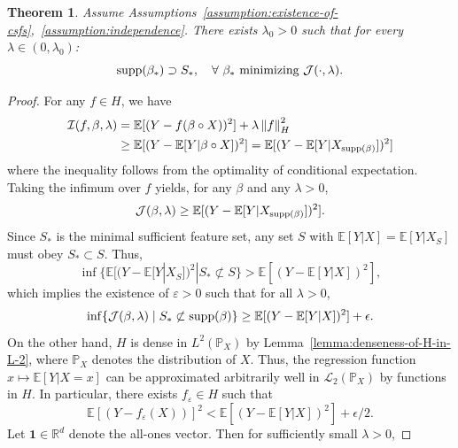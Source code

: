 \documentclass[sn-mathphys-num]{sn-jnl}%
\numberwithin{equation}{section}
\newcommand{\R}{\mathbb{R}}
\newcommand{\E}{\mathbb{E}}
\newcommand{\norm}[1]{\left\|{#1}\right\|} %
\renewcommand{\P}{\mathbb{P}}
\newcommand{\eps}{\epsilon}
\newcommand{\supp}{\mathop{\rm supp}}
\theoremstyle{thmstyleone}%
\newtheorem{theorem}{Theorem}%
\theoremstyle{thmstyletwo}%
\theoremstyle{thmstylethree}%
\begin{document}
\vspace{.5em} 
\begin{theorem}
\label{theorem:global-minimizer-two}
Assume Assumptions~\ref{assumption:existence-of-csfs},~\ref{assumption:independence}. 
There exists $\lambda_0 > 0$ such that for every $\lambda \in (0, \lambda_0)$: 
\begin{equation*}
	\supp(\beta_*) \supset S_*,~~~\forall~\beta_*~\text{minimizing}~\mathcal{J}(\cdot, \lambda). 
\end{equation*}
\end{theorem} 
\begin{proof} 
For any $f \in H$, we have 
\begin{equation*}
\begin{split} 
	\mathcal{I}(f, \beta, \lambda) &= \E[(Y - f(\beta \circ X))^2] + \lambda \norm{f}_H^2  \\
		&\ge \E[(Y - \E[Y| \beta \circ X])^2] = \E[(Y - \E[Y|X_{\supp(\beta)}])^2]
\end{split} 
\end{equation*} 
where the inequality follows from the optimality of conditional expectation.
Taking the infimum over $f$ yields, for any $\beta$ and any $\lambda > 0$,
\begin{equation*}
	\mathcal{J}(\beta, \lambda) \ge \E[(Y - \E[Y|X_{\supp(\beta)}])^2].
\end{equation*}
Since $S_*$ is the minimal sufficient feature set, any set $S$ with $\E[Y|X] = \E[Y|X_S]$ must obey 
$S_* \subset S$. Thus, 
\begin{equation*}
	\inf\{\E[(Y - \E[Y|X_S])^2 | S_* \not \subset S\} > \E[(Y - \E[Y|X])^2],
\end{equation*} 
which implies the existence of $\varepsilon > 0$ such that for all $\lambda > 0$,
\begin{equation*}
	\inf\{\mathcal{J}(\beta, \lambda) \mid S_* \not \subset \supp(\beta)\} \ge \E[(Y - \E[Y|X])^2] + \eps.
\end{equation*}
On the other hand, $H$ is dense in $L^2(\P_X)$ by Lemma~\ref{lemma:denseness-of-H-in-L-2}, where $\P_X$ denotes the distribution of $X$. Thus, the regression function $x \mapsto \E[Y | X = x]$ can be approximated arbitrarily well in $\mathcal{L}_2(\P_X)$ by functions in $H$. In particular, there exists $f_\varepsilon \in H$ such that
\begin{equation*}
	\E[(Y-f_\varepsilon (X))]^2 < \E[(Y - \E[Y|X])^2] + \eps/2.
\end{equation*}
Let $\mathbf{1} \in \R^d$ denote the all-ones vector. Then for sufficiently small $\lambda > 0$, 

\end{proof}
\end{document}
